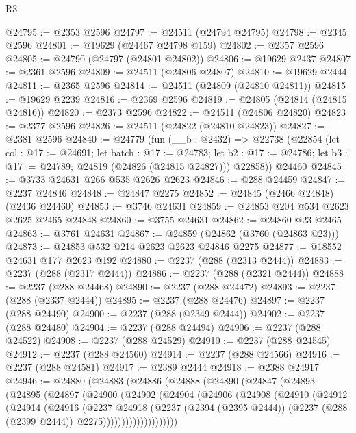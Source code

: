 \begin{lexlean}{R3}
\begin{coremodule}
@24795 := @2353 @2596
@24797 := @24511 (@24794 @24795)
@24798 := @2345 @2596
@24801 := @19629 (@24467 @24798 @159)
@24802 := @2357 @2596
@24805 := @24790 (@24797 (@24801 @24802))
@24806 := @19629 @2437
@24807 := @2361 @2596
@24809 := @24511 (@24806 @24807)
@24810 := @19629 @2444
@24811 := @2365 @2596
@24814 := @24511 (@24809 (@24810 @24811))
@24815 := @19629 @2239
@24816 := @2369 @2596
@24819 := @24805 (@24814 (@24815 @24816))
@24820 := @2373 @2596
@24822 := @24511 (@24806 @24820)
@24823 := @2377 @2596
@24826 := @24511 (@24822 (@24810 @24823))
@24827 := @2381 @2596
@24840 := @24779
    (fun (__b : @2432) =>
    @22738
      (@22854
        (let col : @17 := @24691;
        let batch : @17 := @24783;
        let b2 : @17 := @24786; let b3 : @17 := @24789; @24819 (@24826 (@24815 @24827)))
        @22858))
    @24460
@24845 := @3733 @24631 @266 @535 @2626 @2623
@24846 := @288 @24459
@24847 := @2237 @24846
@24848 := @24847 @2275
@24852 := @24845 (@2466 @24848) (@2436 @24460)
@24853 := @3746 @24631
@24859 := @24853 @204 @534 @2623 @2625 @2465 @24848
@24860 := @3755 @24631
@24862 := @24860 @23 @2465
@24863 := @3761 @24631
@24867 := @24859 (@24862 (@3760 (@24863 @23)))
@24873 := @24853 @532 @214 @2623 @2623 @24846 @2275
@24877 := @18552 @24631 @177 @2623 @192
@24880 := @2237 (@288 (@2313 @2444))
@24883 := @2237 (@288 (@2317 @2444))
@24886 := @2237 (@288 (@2321 @2444))
@24888 := @2237 (@288 @24468)
@24890 := @2237 (@288 @24472)
@24893 := @2237 (@288 (@2337 @2444))
@24895 := @2237 (@288 @24476)
@24897 := @2237 (@288 @24490)
@24900 := @2237 (@288 (@2349 @2444))
@24902 := @2237 (@288 @24480)
@24904 := @2237 (@288 @24494)
@24906 := @2237 (@288 @24522)
@24908 := @2237 (@288 @24529)
@24910 := @2237 (@288 @24545)
@24912 := @2237 (@288 @24560)
@24914 := @2237 (@288 @24566)
@24916 := @2237 (@288 @24581)
@24917 := @2389 @2444
@24918 := @2388 @24917
@24946 := @24880
    (@24883
      (@24886
        (@24888
          (@24890
            (@24847
              (@24893
                (@24895
                  (@24897
                    (@24900
                      (@24902
                        (@24904
                          (@24906
                            (@24908
                              (@24910
                                (@24912
                                  (@24914
                                    (@24916
                                      (@2237
                                        @24918
                                        (@2237
                                          (@2394 (@2395 @2444))
                                          (@2237 (@288 (@2399 @2444)) @2275))))))))))))))))))))

\end{coremodule}
\end{lexlean}
